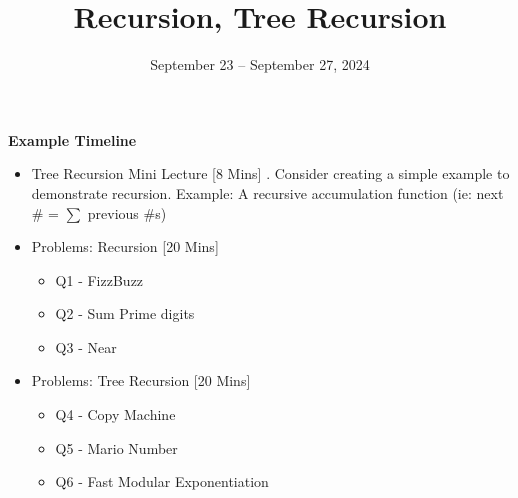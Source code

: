 \documentclass{exam}
\title{Recursion, Tree Recursion}
\date{September 23 -- September 27, 2024}
\begin{document}
\maketitle

\begin{meta}
    \textbf{Example Timeline}
    \begin{itemize}
        \item Tree Recursion Mini Lecture [8 Mins]
            . Consider creating a simple example to demonstrate recursion. Example: A recursive accumulation function (ie: next \# = $\sum$ previous \#s)
        \item Problems: Recursion [20 Mins]
        \begin{itemize}
            \item Q1 - FizzBuzz
            \item Q2 - Sum Prime digits
            \item Q3 - Near
        \end{itemize}
        \item Problems: Tree Recursion [20 Mins]
        \begin{itemize}
            \item Q4 - Copy Machine
            \item Q5 - Mario Number
            \item Q6 - Fast Modular Exponentiation
        \end{itemize}
        
    \end{itemize}
\end{meta}
\end{document}
